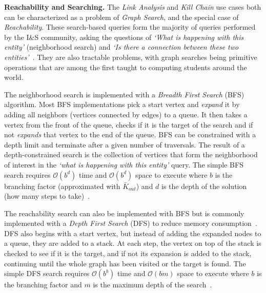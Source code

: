 \textbf{Reachability and Searching.}
The \textit{Link Analysis} and \textit{Kill Chain} use cases both can be characterized as a problem of \textit{Graph Search}, and the special case of \textit{Reachability}.
These search-based queries form the majority of queries performed by the I\&S community, asking the questions of \textit{`What is happening with this entity'} (neighborhood search) and \textit{`Is there a connection between these two entities'}~\cite{Regli2022a}.
They are also tractable problems, with graph searches being primitive operations that are among the first taught to computing students around the world. 

The neighborhood search is implemented with a \textit{Breadth First Search} (BFS) algorithm.
Most BFS implementations pick a start vertex and \textit{expand} it by adding all neighbors (vertices connected by edges) to a queue.
It then takes a vertex from the front of the queue, checks if it is the target of the search and if not \textit{expands} that vertex to the end of the queue.
BFS can be constrained with a depth limit and terminate after a given number of traversals.
The result of a depth-constrained search is the collection of vertices that form the neighborhood of interest in the \textit{`what is happening with this entity'} query.
The simple BFS search requires $\mathcal{O}(b^{d})$ time and $\mathcal{O}(b^{d})$ space to execute where $b$ is the branching factor (approximated with $\bar{K}_{out}$) and $d$ is the depth of the solution (how many steps to take)~\cite{Russell2021}. 

The reachability search can also be implemented with BFS but is commonly implemented with a \textit{Depth First Search} (DFS) to reduce memory consumption~\cite{Vukotic2015}.
DFS also begins with a start vertex, but instead of adding the expanded nodes to a queue, they are added to a stack. 
At each step, the vertex on top of the stack is checked to see if it is the target, and if not its expansion is added to the stack, continuing until the whole graph has been visited or the target is found.
The simple DFS search requires $\mathcal{O}(b^{b})$ time and $\mathcal{O}(bm)$ space to execute where $b$ is the branching factor and $m$ is the maximum depth of the search~\cite{Russell2021}. 


